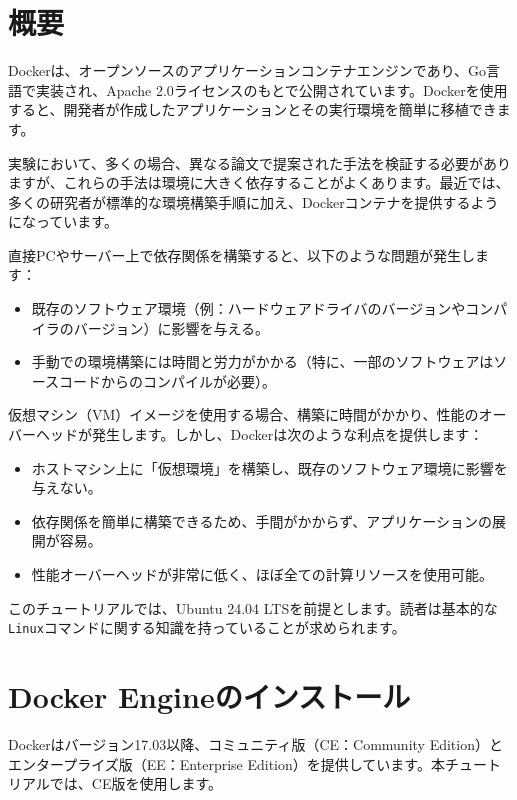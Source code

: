 
\section{概要}
Dockerは、オープンソースのアプリケーションコンテナエンジンであり、Go言語で実装され、Apache 2.0ライセンスのもとで公開されています。Dockerを使用すると、開発者が作成したアプリケーションとその実行環境を簡単に移植できます。

実験において、多くの場合、異なる論文で提案された手法を検証する必要がありますが、これらの手法は環境に大きく依存することがよくあります。最近では、多くの研究者が標準的な環境構築手順に加え、Dockerコンテナを提供するようになっています。

直接PCやサーバー上で依存関係を構築すると、以下のような問題が発生します：
\begin{itemize}
    \item 既存のソフトウェア環境（例：ハードウェアドライバのバージョンやコンパイラのバージョン）に影響を与える。
    \item 手動での環境構築には時間と労力がかかる（特に、一部のソフトウェアはソースコードからのコンパイルが必要）。
\end{itemize}

仮想マシン（VM）イメージを使用する場合、構築に時間がかかり、性能のオーバーヘッドが発生します。しかし、Dockerは次のような利点を提供します：
\begin{itemize}
    \item ホストマシン上に「仮想環境」を構築し、既存のソフトウェア環境に影響を与えない。
    \item 依存関係を簡単に構築できるため、手間がかからず、アプリケーションの展開が容易。
    \item 性能オーバーヘッドが非常に低く、ほぼ全ての計算リソースを使用可能。
\end{itemize}

このチュートリアルでは、Ubuntu 24.04 LTSを前提とします。読者は基本的な\texttt{Linux}コマンドに関する知識を持っていることが求められます。

\section{Docker Engineのインストール}
Dockerはバージョン17.03以降、コミュニティ版（CE：Community Edition）とエンタープライズ版（EE：Enterprise Edition）を提供しています。本チュートリアルでは、CE版を使用します。

